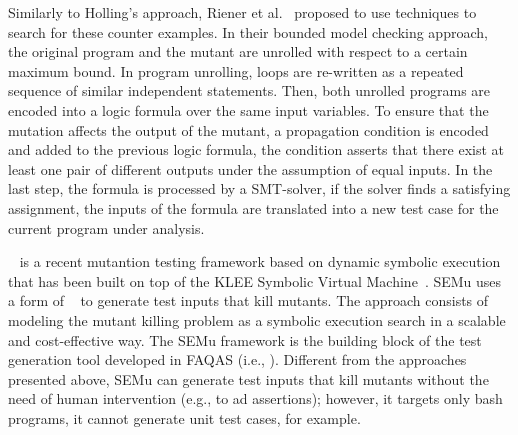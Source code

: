 Similarly to Holling's approach, Riener et al.~\cite{riener2011test} proposed to use  techniques to search for these counter examples.
In their bounded model checking approach, the original program and the mutant are unrolled with respect to a certain maximum bound. In program unrolling, loops are re-written as a repeated sequence of similar independent statements. Then, both unrolled programs are encoded into a logic formula over the same input variables. To ensure that the mutation affects the output of the mutant, a propagation condition is encoded and added to the previous logic formula, the condition asserts that there exist at least one pair of different outputs under the assumption of equal inputs. In the last step, the formula is processed by a SMT-solver, if the solver finds a satisfying assignment, the inputs of the formula are translated into a new test case for the current program under analysis.







~\cite{chekam2021killing} is a recent mutantion testing  framework based on dynamic symbolic execution that has been built on top of the KLEE Symbolic Virtual Machine~\cite{cadar2008klee}.
SEMu uses a form of ~\cite{person2008differential} to generate test inputs that kill mutants. The approach consists of modeling the mutant killing problem as a symbolic execution search in a scalable and cost-effective way. 
The SEMu framework is the building block of 
the test generation tool developed in FAQAS (i.e., ). Different from the approaches presented above, SEMu can generate test inputs that kill mutants without the need of human intervention (e.g., to ad assertions); however, it targets only bash programs, it cannot generate unit test cases, for example.

